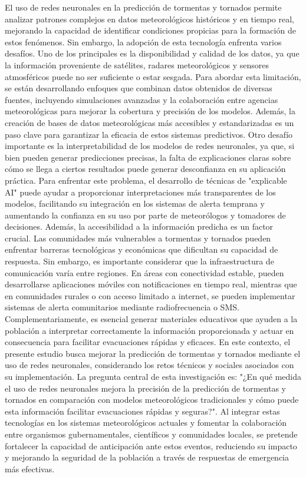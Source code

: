 \documentclass{article}
\begin{document}
El uso de redes neuronales en la predicción de tormentas y tornados permite analizar patrones complejos en datos meteorológicos históricos y en tiempo real, mejorando la capacidad de identificar condiciones propicias para la formación de estos fenómenos. Sin embargo, la adopción de esta tecnología enfrenta varios desafíos. Uno de los principales es la disponibilidad y calidad de los datos, ya que la información proveniente de satélites, radares meteorológicos y sensores atmosféricos puede no ser suficiente o estar sesgada. Para abordar esta limitación, se están desarrollando enfoques que combinan datos obtenidos de diversas fuentes, incluyendo simulaciones avanzadas y la colaboración entre agencias meteorológicas para mejorar la cobertura y precisión de los modelos. Además, la creación de bases de datos meteorológicas más accesibles y estandarizadas es un paso clave para garantizar la eficacia de estos sistemas predictivos.
Otro desafío importante es la interpretabilidad de los modelos de redes neuronales, ya que, si bien pueden generar predicciones precisas, la falta de explicaciones claras sobre cómo se llega a ciertos resultados puede generar desconfianza en su aplicación práctica. Para enfrentar este problema, el desarrollo de técnicas de "explicable AI" puede ayudar a proporcionar interpretaciones más transparentes de los modelos, facilitando su integración en los sistemas de alerta temprana y aumentando la confianza en su uso por parte de meteorólogos y tomadores de decisiones.
Además, la accesibilidad a la información predicha es un factor crucial. Las comunidades más vulnerables a tormentas y tornados pueden enfrentar barreras tecnológicas y económicas que dificultan su capacidad de respuesta. Sin embargo, es importante considerar que la infraestructura de comunicación varía entre regiones. En áreas con conectividad estable, pueden desarrollarse aplicaciones móviles con notificaciones en tiempo real, mientras que en comunidades rurales o con acceso limitado a internet, se pueden implementar sistemas de alerta comunitarios mediante radiofrecuencia o SMS. Complementariamente, es esencial generar materiales educativos que ayuden a la población a interpretar correctamente la información proporcionada y actuar en consecuencia para facilitar evacuaciones rápidas y eficaces.
En este contexto, el presente estudio busca mejorar la predicción de tormentas y tornados mediante el uso de redes neuronales, considerando los retos técnicos y sociales asociados con su implementación. La pregunta central de esta investigación es: "¿En qué medida el uso de redes neuronales mejora la precisión de la predicción de tormentas y tornados en comparación con modelos meteorológicos tradicionales y cómo puede esta información facilitar evacuaciones rápidas y seguras?". Al integrar estas tecnologías en los sistemas meteorológicos actuales y fomentar la colaboración entre organismos gubernamentales, científicos y comunidades locales, se pretende fortalecer la capacidad de anticipación ante estos eventos, reduciendo su impacto y mejorando la seguridad de la población a través de respuestas de emergencia más efectivas.
\end{document}
